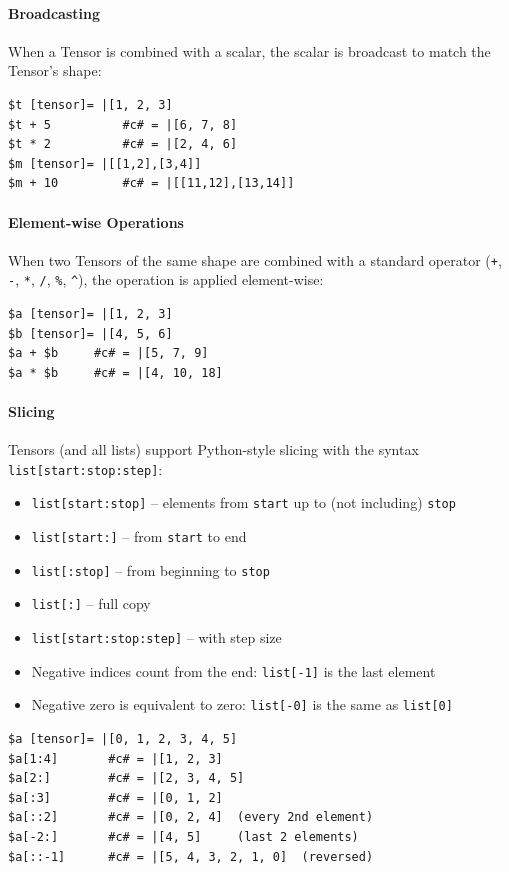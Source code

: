 \paragraph{Broadcasting}
When a Tensor is combined with a scalar, the scalar is broadcast to match the Tensor's shape:
\begin{verbatim}
$t [tensor]= |[1, 2, 3]
$t + 5          #c# = |[6, 7, 8]
$t * 2          #c# = |[2, 4, 6]
$m [tensor]= |[[1,2],[3,4]]
$m + 10         #c# = |[[11,12],[13,14]]
\end{verbatim}

\paragraph{Element-wise Operations}
When two Tensors of the same shape are combined with a standard operator (\texttt{+}, \texttt{-}, \texttt{*}, \texttt{/}, \texttt{\%}, \texttt{\^{}}), the operation is applied element-wise:
\begin{verbatim}
$a [tensor]= |[1, 2, 3]
$b [tensor]= |[4, 5, 6]
$a + $b     #c# = |[5, 7, 9]
$a * $b     #c# = |[4, 10, 18]
\end{verbatim}

\paragraph{Slicing}
Tensors (and all lists) support Python-style slicing with the syntax \texttt{list[start:stop:step]}:
\begin{itemize}
\item \texttt{list[start:stop]} -- elements from \texttt{start} up to (not including) \texttt{stop}
\item \texttt{list[start:]} -- from \texttt{start} to end
\item \texttt{list[:stop]} -- from beginning to \texttt{stop}
\item \texttt{list[:]} -- full copy
\item \texttt{list[start:stop:step]} -- with step size
\item Negative indices count from the end: \texttt{list[-1]} is the last element
\item Negative zero is equivalent to zero: \texttt{list[-0]} is the same as \texttt{list[0]}
\end{itemize}
\begin{verbatim}
$a [tensor]= |[0, 1, 2, 3, 4, 5]
$a[1:4]       #c# = |[1, 2, 3]
$a[2:]        #c# = |[2, 3, 4, 5]
$a[:3]        #c# = |[0, 1, 2]
$a[::2]       #c# = |[0, 2, 4]  (every 2nd element)
$a[-2:]       #c# = |[4, 5]     (last 2 elements)
$a[::-1]      #c# = |[5, 4, 3, 2, 1, 0]  (reversed)
\end{verbatim}

